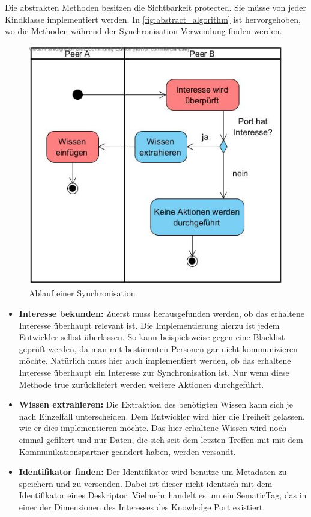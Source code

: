 \documentclass[a4paper]{article}
\begin{document}
	Die abstrakten Methoden besitzen die Sichtbarkeit protected. Sie 
	müsse von jeder Kindklasse implementiert werden. In
	\autoref{fig:abstract_algorithm} ist hervorgehoben, wo
	die Methoden während der Synchronisation Verwendung finden werden. 
	
	\begin{figure}[H]
		\includegraphics[width=\linewidth]{../Bilder/abstract_algorithm.jpg}
		\caption{Ablauf einer Synchronisation}
		\label{fig:abstract_algorithm}
	\end{figure}	
		
	\newpage
	\begin{itemize}
		\item \textbf{Interesse bekunden:} Zuerst muss herausgefunden werden,
		ob das erhaltene Interesse überhaupt relevant ist. Die Implementierung
		hierzu ist jedem Entwickler selbst überlassen. So kann beispielsweise
		gegen eine Blacklist geprüft werden, da man mit bestimmten Personen
		gar nicht kommunizieren möchte. Natürlich muss hier auch implementiert 
		werden, ob das erhaltene Interesse überhaupt ein Interesse zur
		Synchronisation ist. Nur wenn diese Methode true zurückliefert werden
		weitere Aktionen durchgeführt.
		\item \textbf{Wissen extrahieren:} Die Extraktion des benötigten Wissen 
		kann sich je nach Einzelfall unterscheiden. Dem Entwickler wird hier die
		Freiheit gelassen, wie er dies implementieren möchte. Das hier 
		erhaltene Wissen wird noch einmal gefiltert und nur Daten, die sich seit
		dem letzten Treffen mit mit dem Kommunikationspartner geändert haben,
		werden versandt.
		\item \textbf{Identifikator finden:} Der Identifikator wird benutze
		um Metadaten zu speichern und zu versenden. Dabei ist dieser nicht
		identisch mit dem Identifikator eines Deskriptor. Vielmehr handelt es
		um ein SematicTag, das in einer der Dimensionen des Interesses des
		Knowledge Port existiert.
	\end{itemize}
	
\end{document}
